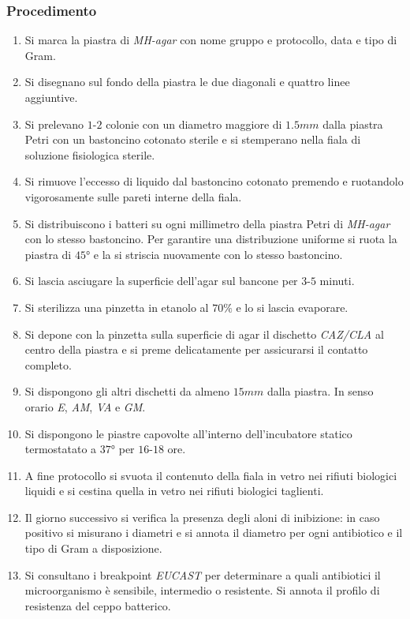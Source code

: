 		\subsubsection{Procedimento}
		\begin{enumerate}
			\item Si marca la piastra di \emph{MH-agar} con nome gruppo e protocollo, data e tipo di Gram.
			\item Si disegnano sul fondo della piastra le due diagonali e quattro linee aggiuntive.
			\item Si prelevano $1$-$2$ colonie con un diametro maggiore di $1.5\si{mm}$ dalla piastra Petri con un bastoncino cotonato sterile e si stemperano nella fiala di soluzione fisiologica sterile.
			\item Si rimuove l'eccesso di liquido dal bastoncino cotonato premendo e ruotandolo vigorosamente sulle pareti interne della fiala.
			\item Si distribuiscono i batteri su ogni millimetro della piastra Petri di \emph{MH-agar} con lo stesso bastoncino.
				Per garantire una distribuzione uniforme si ruota la piastra di $45\si{\degree}$ e la si striscia nuovamente con lo stesso bastoncino.
			\item Si lascia asciugare la superficie dell'agar sul bancone per $3$-$5$ minuti.
			\item Si sterilizza una pinzetta in etanolo al $70\%$ e lo si lascia evaporare.
			\item Si depone con la pinzetta sulla superficie di agar il dischetto \emph{CAZ/CLA} al centro della piastra e si preme delicatamente per assicurarsi il contatto completo.
			\item Si dispongono gli altri dischetti da almeno $15\si{mm}$ dalla piastra.
				In senso orario \emph{E}, \emph{AM}, \emph{VA} e \emph{GM}.
			\item Si dispongono le piastre capovolte all'interno dell'incubatore statico termostatato a $37\si{\degree}$ per $16$-$18$ ore.
			\item A fine protocollo si svuota il contenuto della fiala in vetro nei rifiuti biologici liquidi e si cestina quella in vetro nei rifiuti biologici taglienti.
			\item Il giorno successivo si verifica la presenza degli aloni di inibizione: in caso positivo si misurano i diametri e si annota il diametro per ogni antibiotico e il tipo di Gram a disposizione.
			\item Si consultano i breakpoint \emph{EUCAST} per determinare a quali antibiotici il microorganismo \`e sensibile, intermedio o resistente.
				Si annota il profilo di resistenza del ceppo batterico.
		\end{enumerate}

